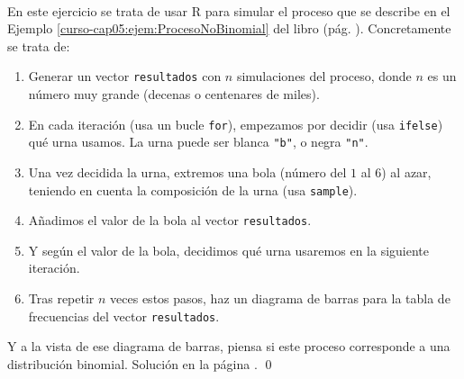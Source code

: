\documentclass[10pt,a4paper]{article}\usepackage[]{graphicx}\usepackage[]{color}
\begin{document}
\begin{ejercicio}
\label{tut05:ejercicio55}
\quad\\
En este ejercicio se trata de usar R para simular el proceso que se describe en el Ejemplo \ref{curso-cap05:ejem:ProcesoNoBinomial} del libro (pág. \pageref{curso-cap05:ejem:ProcesoNoBinomial}). Concretamente se trata de:
      \begin{enumerate}
        \item Generar un vector {\tt resultados} con $n$ simulaciones del proceso, donde $n$ es un número muy grande (decenas o centenares de miles).
        \item En cada iteración (usa un bucle {\tt for}), empezamos por decidir (usa {\tt ifelse}) qué urna usamos. La urna puede ser blanca \verb#"b"#, o negra \verb#"n"#.

        \item Una vez decidida la urna, extremos una bola (número del $1$ al $6$) al azar, teniendo en cuenta la composición de la urna (usa {\tt sample}).
        \item Añadimos el valor de la bola al vector {\tt resultados}.
        \item Y según el valor de la bola, decidimos qué urna usaremos en la siguiente iteración.

        \item Tras repetir $n$ veces estos pasos, haz un diagrama de barras para la tabla de frecuencias del vector {\tt resultados}.
      \end{enumerate}
      Y a la vista de ese diagrama de barras, piensa si este proceso corresponde a una distribución binomial. Solución en la página \pageref{tut05:ejercicio55:sol}.
\qed
\end{ejercicio}
\end{document}
